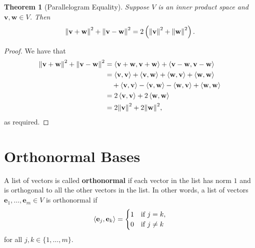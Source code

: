 \documentclass[11pt]{article}
\renewcommand{\vec}[1]{\mathbf{#1}}
\newtheorem{theorem}{Theorem}
\begin{document}
\begin{adjustwidth}{0.5cm}{}
  \begin{theorem}[Parallelogram Equality]
		  Suppose $V$ is an inner product space and $\vec{v}, \vec{w} \in V$. Then 
		  \[
			  \norm{\vec{v} + \vec{w}}^{2} + \norm{\vec{v} - \vec{w}}^{2} = 2 \left( \norm{\vec{v}}^{2} + \norm{\vec{w}}^{2} \right).
		  \]
  \end{theorem}
	\begin{proof}
		We have that
		\begin{align*}
			\norm{\vec{v} + \vec{w}}^{2} + \norm{\vec{v} - \vec{w}}^{2} &= \ev{\vec{v} + \vec{w}, \vec{v} + \vec{w}} + \ev{\vec{v} - \vec{w}, \vec{v} - \vec{w}} \\ 
			&= \ev{\vec{v}, \vec{v}} + \ev{\vec{v}, \vec{w}} + \ev{\vec{w}, \vec{v}} + \ev{\vec{w}, \vec{w}} \\
			& \quad + \ev{\vec{v}, \vec{v}} - \ev{\vec{v}, \vec{w}} - \ev{\vec{w}, \vec{v}} + \ev{\vec{w}, \vec{w}} \\
			&= 2 \ev{\vec{v}, \vec{v}} + 2 \ev{\vec{w}, \vec{w}} \\
			&= 2 \norm{\vec{v}}^{2} + 2 \norm{\vec{w}}^{2},
		\end{align*}
		as required.
	\end{proof}
\end{adjustwidth}


\section{Orthonormal Bases}


A list of vectors is called \textbf{orthonormal} if each vector in the list has norm $1$ and is orthogonal to all the other vectors in the list. In other words, a list of vectors $\vec{e}_{1}, \ldots, \vec{e}_{m} \in V$ is orthonormal if
\[
	\ev{\vec{e}_{j}, \vec{e}_{k}} =
	\begin{cases}
		1 & \text{if } j = k, \\
		0 & \text{if } j \ne k
	\end{cases}
\]
for all $j, k \in \{ 1, \ldots, m \}$.
\end{document}
